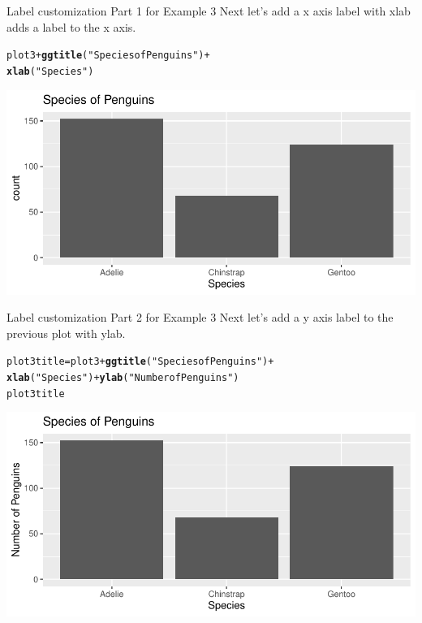 \documentclass{beamer}\usepackage[]{graphicx}\usepackage[]{xcolor}
\makeatletter
\newcommand{\hlstr}[1]{\textcolor[rgb]{0.192,0.494,0.8}{#1}}%
\newcommand{\hlopt}[1]{\textcolor[rgb]{0,0,0}{#1}}%
\newcommand{\hlstd}[1]{\textcolor[rgb]{0.345,0.345,0.345}{#1}}%
\newcommand{\hlkwb}[1]{\textcolor[rgb]{0.69,0.353,0.396}{#1}}%
\newcommand{\hlkwd}[1]{\textcolor[rgb]{0.737,0.353,0.396}{\textbf{#1}}}%
\newenvironment{kframe}{%
 \def\at@end@of@kframe{}%
 \ifinner\ifhmode%
  \def\at@end@of@kframe{\end{minipage}}%
  \begin{minipage}{\columnwidth}%
 \fi\fi%
 \def\FrameCommand##1{\hskip\@totalleftmargin \hskip-\fboxsep
 \colorbox{shadecolor}{##1}\hskip-\fboxsep
     \hskip-\linewidth \hskip-\@totalleftmargin \hskip\columnwidth}%
 \MakeFramed {\advance\hsize-\width
   \@totalleftmargin\z@ \linewidth\hsize
   \@setminipage}}%
 {\par\unskip\endMakeFramed%
 \at@end@of@kframe}
\newenvironment{knitrout}{}{} %
\makeatother
\begin{document}
\begin{frame}[fragile]{Label customization Part 1 for Example 3}
Next let's add a x axis label  with  xlab adds a label to the x axis.
\begin{knitrout}
\color{fgcolor}\begin{kframe}
\begin{alltt}
\hlstd{plot3} \hlopt{+} \hlkwd{ggtitle}\hlstd{(}\hlstr{"Species of Penguins"}\hlstd{)} \hlopt{+}
    \hlkwd{xlab}\hlstd{(}\hlstr{"Species"}\hlstd{)}
\end{alltt}
\end{kframe}
\includegraphics[width=0.95\linewidth]{figure/unnamed-chunk-13-1} 
\end{knitrout}
\end{frame}
\begin{frame}[fragile]{Label customization Part 2 for Example 3}
Next let's add a y axis label to the previous plot with ylab.
\begin{knitrout}
\color{fgcolor}\begin{kframe}
\begin{alltt}
\hlstd{plot3title} \hlkwb{=} \hlstd{plot3} \hlopt{+} \hlkwd{ggtitle}\hlstd{(}\hlstr{"Species of Penguins"}\hlstd{)} \hlopt{+}
    \hlkwd{xlab}\hlstd{(}\hlstr{"Species"}\hlstd{)} \hlopt{+} \hlkwd{ylab}\hlstd{(}\hlstr{"Number of Penguins"}\hlstd{)}
\hlstd{plot3title}
\end{alltt}
\end{kframe}
\includegraphics[width=0.95\linewidth]{figure/unnamed-chunk-14-1} 
\end{knitrout}
\end{frame}
\end{document}
